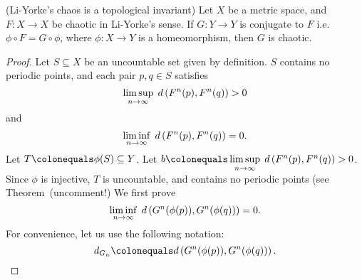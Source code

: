 \documentclass[10pt,draft,twoside]{book}
\begin{document}
\begin{theorem}
  (Li-Yorke's chaos is a topological invariant)
  Let $X$ be a metric space, and $F: X\to X$ be chaotic in Li-Yorke's sense.
  If $G: Y\to Y$ is conjugate to $F$ i.e. $\phi \circ F = G \circ \phi$, where $\phi: X \to Y$ is a homeomorphism, then $G$ is chaotic.
  \begin{proof}
    Let $S \subseteq X$ be an uncountable set given by definition.
    $S$ contains no periodic points, and each pair $p,q \in S$ satisfies
    \begin{equation*}
      \limsup\limits_{n \to \infty}\; d\left( F^{n}(p) , F^{n}(q) \right) > 0
    \end{equation*}
    and
    \begin{equation*}
      \liminf\limits_{n \to \infty}\; d\left( F^{n}(p) , F^{n}(q) \right) = 0.
    \end{equation*}
    Let $T \ceq \phi(S) \subseteq Y$.
    Let $b \ceq \limsup\limits_{n \to \infty}\; \metric{\itr{F}{n}(p) , \itr{F}{n}(q)} > 0$.
    Since $\phi$ is injective, $T$ is uncountable, and contains no periodic points (see Theorem~(uncomment!)%
    We first prove
    \begin{equation*}
      \liminf\limits_{n \to \infty}\; d\left( G^{n}(\phi(p)) , G^{n}(\phi(q)) \right) = 0.
    \end{equation*}
    For convenience, let us use the following notation:
    \begin{equation*}
      d_{G_n} \ceq \metric{\itr{G}{n}(\phi(p)) , \itr{G}{n}(\phi(q))}.
    \end{equation*}


\end{proof}
\end{theorem}
\end{document}
